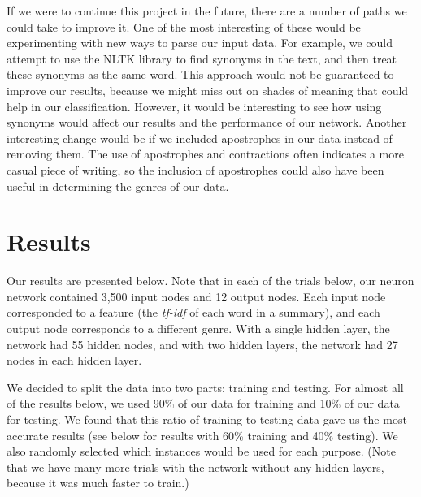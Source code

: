 \documentclass[11pt,letterpaper]{article}
\begin{document}
If we were to continue this project in the future, there are a number of paths we could take to improve it. One of the most interesting of these would be experimenting with new ways to parse our input data. For example, we could attempt to use the NLTK library to find synonyms in the text, and then treat these synonyms as the same word. This approach would not be guaranteed to improve our results, because we might miss out on shades of meaning that could help in our classification. However, it would be interesting to see how using synonyms would affect our results and the performance of our network. Another interesting change would be if we included apostrophes in our data instead of removing them. The use of apostrophes and contractions often indicates a more casual piece of writing, so the inclusion of apostrophes could also have been useful in determining the genres of our data.

\section{Results}

Our results are presented below. Note that in each of the trials below, our neuron network contained 3,500 input nodes and 12 output nodes. Each input node corresponded to a feature (the \emph{tf-idf} of each word in a summary), and each output node corresponds to a different genre.  With a single hidden layer, the network had 55 hidden nodes, and with two hidden layers, the network had 27 nodes in each hidden layer.

We decided to split the data into two parts: training and testing. For almost all of the results below, we used 90\% of our data for training and 10\% of our data for testing. We found that this ratio of training to testing data gave us the most accurate results (see below for results with 60\% training and 40\% testing). We also randomly selected which instances would be used for each purpose. (Note that we have many more trials with the network without any hidden layers, because it was much faster to train.) \\
\end{document}
